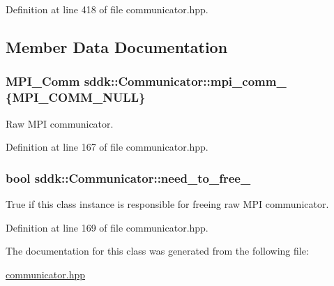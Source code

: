 Definition at line 418 of file communicator.\+hpp.



\subsection{Member Data Documentation}
\hypertarget{classsddk_1_1_communicator_a33aeacc7ce79d5910f6c31988d07735b}{}
\subsubsection[{mpi\+\_\+comm\+\_\+}]{\setlength{\rightskip}{0pt plus 5cm}M\+P\+I\+\_\+\+Comm sddk\+::\+Communicator\+::mpi\+\_\+comm\+\_\+ \{M\+P\+I\+\_\+\+C\+O\+M\+M\+\_\+\+N\+U\+L\+L\}\hspace{0.3cm}{\ttfamily [private]}}\label{classsddk_1_1_communicator_a33aeacc7ce79d5910f6c31988d07735b}


Raw M\+P\+I communicator. 



Definition at line 167 of file communicator.\+hpp.

\hypertarget{classsddk_1_1_communicator_a7dfce793f7d5571fb69dcfac81814403}{}
\subsubsection[{need\+\_\+to\+\_\+free\+\_\+}]{\setlength{\rightskip}{0pt plus 5cm}bool sddk\+::\+Communicator\+::need\+\_\+to\+\_\+free\+\_\+\hspace{0.3cm}{\ttfamily [private]}}\label{classsddk_1_1_communicator_a7dfce793f7d5571fb69dcfac81814403}


True if this class instance is responsible for freeing raw M\+P\+I communicator. 



Definition at line 169 of file communicator.\+hpp.



The documentation for this class was generated from the following file\+:\begin{DoxyCompactItemize}
\item 
\hyperlink{communicator_8hpp}{communicator.\+hpp}\end{DoxyCompactItemize}
